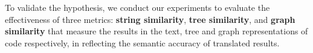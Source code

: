 %
%
To validate the hypothesis, we conduct our experiments to evaluate the
effectiveness of three metrics: \textbf{string similarity}, 
\textbf{tree similarity}, and \textbf{graph similarity} that measure 
the results in the text, tree and graph representations of code respectively, 
in reflecting the semantic accuracy of translated results.


 

